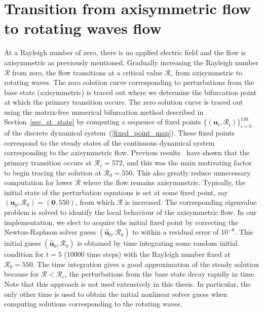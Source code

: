 \section{Transition from axisymmetric flow to rotating waves flow} \label{sec_axi2rot}
At a Rayleigh number of zero, there is no applied electric field and the flow is axisymmetric as previously mentioned. Gradually increasing the Rayleigh number $\mathcal{R}$ from zero, the flow transitions at a critical value $\mathcal{R}_c$ from axisymmetric to rotating waves. The zero solution curve corresponding to perturbations from the base state (axisymmetric) is traced out where we determine the bifurcation point at which the primary transition occurs.
The zero solution curve is traced out using the matrix-free numerical bifurcation method described in Section~\ref{sec_st_state} by computing a sequence of fixed points $\{(\mathbf{u}_i,\mathcal{R}_i)\}_{i=0}^{130}$ of the discrete dynamical system~(\ref{fixed_point_map}). These fixed points correspond to the steady states of the continuous dynamical system corresponding to the axisymmetric flow. Previous results~\cite{PeiChunTsain} have shown that the primary transition occurs at $\mathcal{R}_c = 572$, and this was the main motivating factor to begin tracing the solution at $\mathcal{R}_0 = 550$. This also greatly reduce unnecessary computation for lower $\mathcal{R}$ where the flow remains axisymmetric. Typically, the initial state of the perturbation equations is set at some fixed point, say $(\mathbf{u}_0,\mathcal{R}_0) = (\boldsymbol{0},550)$, from which $\mathcal{R}$ is increased. The corresponding eigenvalue problem is solved to identify the local behaviour of the axisymmetric flow. In our implementation, we elect to acquire the initial fixed point by correcting the Newton-Raphson solver guess $(\hat{\mathbf{u}}_{0},\mathcal{R}_0)$ to within a residual error of $10^{-8}$. This initial guess $(\hat{\mathbf{u}}_{0},\mathcal{R}_0)$ is obtained by time integrating some random initial condition for $t = 5$ (10000 time steps) with the Rayleigh number fixed at $\mathcal{R}_{0} = 550$. The time integration gives a good approximation of the steady solution because for $\mathcal{R} < \mathcal{R}_c$, the perturbations from the base state decay rapidly in time. Note that this approach is not used extensively in this thesis. In particular, the only other time is used to obtain the initial nonlinear solver guess when computing solutions corresponding to the rotating waves.

